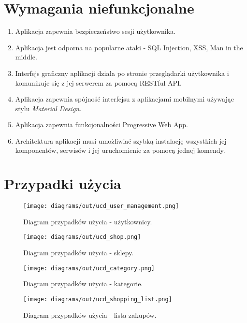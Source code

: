 \section{Wymagania niefunkcjonalne}
\begin{enumerate}
    \item Aplikacja zapewnia bezpieczeństwo sesji użytkownika.
    \item Aplikacja jest odporna na popularne ataki - SQL Injection, XSS, Man in the middle.
    \item Interfejs graficzny aplikacji działa po stronie przeglądarki użytkownika i komunikuje się z jej serwerem za pomocą RESTful API.
    \item Aplikacja zapewnia spójność interfejsu z aplikacjami mobilnymi używając stylu \textit{Material Design}.
    \item Aplikacja zapewnia funkcjonalności Progressive Web App.
    \item Architektura aplikacji musi umożliwiać szybką instalację wszystkich jej komponentów, serwisów i jej uruchomienie za pomocą jednej komendy.
\end{enumerate}

\newpage
\section{Przypadki użycia}

\begin{figure}[!htb]
    \centering
    \texttt{[image: diagrams/out/ucd\_user\_management.png]}
    \caption{Diagram przypadków użycia - użytkownicy.}
\end{figure}

\begin{figure}[!htb]
    \centering
    \begin{minipage}[b]{0.45\textwidth}
        \texttt{[image: diagrams/out/ucd\_shop.png]}
        \caption{Diagram przypadków użycia - sklepy.}
    \end{minipage}
    \hfill
    \begin{minipage}[b]{0.45\textwidth}
        \texttt{[image: diagrams/out/ucd\_category.png]}
        \caption{Diagram przypadków użycia - kategorie.}
    \end{minipage}
\end{figure}

\begin{figure}[!htb]
    \centering
    \texttt{[image: diagrams/out/ucd\_shopping\_list.png]}
    \caption{Diagram przypadków użycia - lista zakupów.}
\end{figure}

